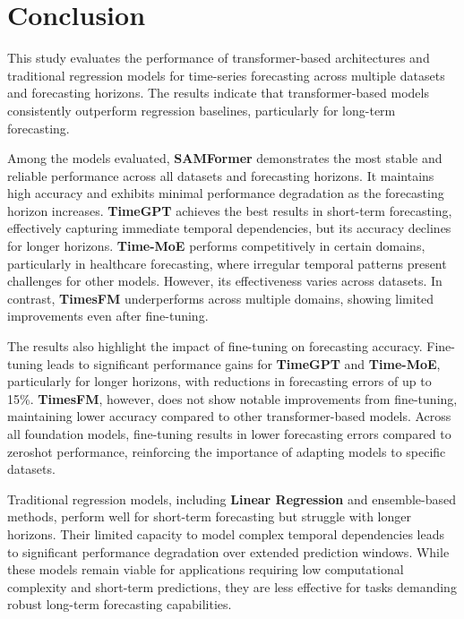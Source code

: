 \chapter{Conclusion}\label{ch10:conclusion}

This study evaluates the performance of transformer-based architectures and traditional regression models for time-series forecasting across multiple datasets and forecasting horizons. The results indicate that transformer-based models consistently outperform regression baselines, particularly for long-term forecasting.

Among the models evaluated, \textbf{SAMFormer} demonstrates the most stable and reliable performance across all datasets and forecasting horizons. It maintains high accuracy and exhibits minimal performance degradation as the forecasting horizon increases. \textbf{TimeGPT} achieves the best results in short-term forecasting, effectively capturing immediate temporal dependencies, but its accuracy declines for longer horizons. \textbf{Time-MoE} performs competitively in certain domains, particularly in healthcare forecasting, where irregular temporal patterns present challenges for other models. However, its effectiveness varies across datasets. In contrast, \textbf{TimesFM} underperforms across multiple domains, showing limited improvements even after fine-tuning.

The results also highlight the impact of fine-tuning on forecasting accuracy. Fine-tuning leads to significant performance gains for \textbf{TimeGPT} and \textbf{Time-MoE}, particularly for longer horizons, with reductions in forecasting errors of up to 15\%. \textbf{TimesFM}, however, does not show notable improvements from fine-tuning, maintaining lower accuracy compared to other transformer-based models. Across all foundation models, fine-tuning results in lower forecasting errors compared to zeroshot performance, reinforcing the importance of adapting models to specific datasets.

Traditional regression models, including \textbf{Linear Regression} and ensemble-based methods, perform well for short-term forecasting but struggle with longer horizons. Their limited capacity to model complex temporal dependencies leads to significant performance degradation over extended prediction windows. While these models remain viable for applications requiring low computational complexity and short-term predictions, they are less effective for tasks demanding robust long-term forecasting capabilities.

